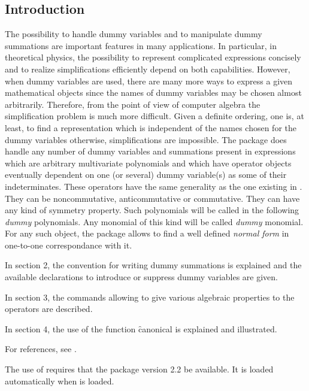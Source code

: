 

\subsection{Introduction}
The possibility to handle dummy variables and to manipulate  
dummy summations are important features in many applications. In particular, 
in theoretical physics, the possibility to represent complicated expressions
concisely and to realize simplifications efficiently depend 
on both capabilities.
However, when dummy variables are used, there are many more  ways 
to express a given mathematical objects since 
the names of dummy variables may be chosen  almost arbitrarily.
Therefore, from the point of view of computer algebra
the simplification problem is much more difficult. 
Given a definite ordering, one is, at least, to find a representation which 
is independent of the names chosen for the dummy variables otherwise, 
simplifications are impossible.  
The package does handle any number of dummy variables and summations 
present in expressions which are arbitrary multivariate polynomials  
and which  have operator objects eventually dependent on one (or several) 
dummy variable(s) as some of their indeterminates.
These operators have the same generality as the one existing in {\REDUCE}.  
They can be noncommutative, anticommutative or commutative. They can have 
any kind of symmetry property.
Such polynomials will be called in the following \emph{dummy} polynomials.
Any monomial of this kind will be called  \emph{dummy} monomial.
For any such object, the package allows to find a well defined 
\emph{normal form} in one-to-one correspondance with it.

In section 2, the convention for writing dummy summations is explained 
and the available declarations to introduce or suppress dummy variables
are given.

In section 3, the commands allowing to give 
various algebraic properties to the operators are described.

In section 4, the use of the function \f{canonical} is 
explained and illustrated.

For references, see \cite{BUTLER1985363,ButlerCannon1982a,Butler1982a,Leon1980a,Leon1984a,Leon1991PermutationGA,Linton1991415,McKay1977a,RodinonovElAl1989a,Sims1971a,Sims1971b,Burnel1994a,Caprasse1997a}.

The use of  requires that the package  
 version 2.2 be available. It is loaded automatically when  is loaded.

